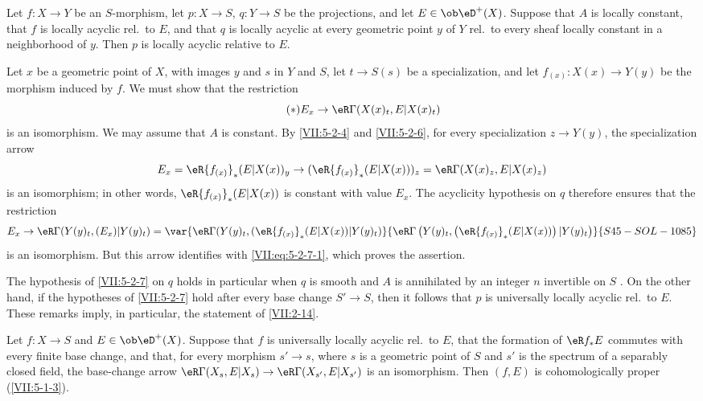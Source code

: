 \begin{corollary}\label{VII:5-2-7}
Let $f:X\to Y$ be an $S$-morphism, let $p:X\to S$, $q:Y\to S$ be the
projections, and let $E\in\ob\eD^+(X)$. Suppose that $A$ is locally constant,
that $f$ is locally acyclic rel.\ to $E$, and that $q$ is locally acyclic at
every geometric point $y$ of $Y$ rel.\ to every sheaf locally constant
in a neighborhood of $y$. Then $p$ is locally acyclic relative to $E$.
\end{corollary}

Let $x$ be a geometric point of $X$, with images $y$ and $s$ in $Y$ and $S$,
let $t\to S(s)$ be a specialization, and let
$f_{(x)}:X(x)\to Y(y)$ be the morphism induced by $f$. We must show that the
restriction
\begin{equation*}\tag{$*$}\label{VII:eq:5-2-7-1}
  E_x \to \eR\Gamma(X(x)_t,E|X(x)_t) 
\end{equation*}
is an isomorphism. We may assume that $A$ is constant. By \ref{VII:5-2-4} and
\ref{VII:5-2-6}, for every specialization $z\to Y(y)$, the specialization
arrow
\[
  E_x = \eR {f_{(x)}}_\ast (E|X(x))_y \to (\eR {f_{(x)}}_\ast (E|X(x)))_z = \eR\Gamma(X(x)_z,E|X(x)_z) 
\]
is an isomorphism; in other words, $\eR{f_{(x)}}_\ast(E|X(x))$ is constant
with value $E_x$. The acyclicity hypothesis on $q$ therefore ensures that the restriction
\[
  E_x \to \eR\Gamma(Y(y)_t,(E_x)|Y(y)_t) = \var{\eR\Gamma(Y(y)_t,(\eR {f_{(x)}}_\ast (E|X(x))|Y(y)_t)}{\eR\Gamma\left(Y(y)_t,\left(\eR {f_{(x)}}_\ast (E|X(x))\right)|Y(y)_t\right)}{S45-SOL-1085}
\]
is an isomorphism. But this arrow identifies with
\eqref{VII:eq:5-2-7-1}, which proves the assertion.

The hypothesis of \ref{VII:5-2-7} on $q$ holds in particular when $q$ is
smooth and $A$ is annihilated by an integer $n$ invertible on $S$
\cite[XV]{sga4}. On the other hand, if the hypotheses of \ref{VII:5-2-7} hold
after every base change $S'\to S$, then it follows that $p$ is universally
locally acyclic rel.\ to $E$. These remarks imply, in particular, the
statement of \ref{VII:2-14}.






\begin{corollary}\label{VII:5-2-8}
Let $f:X\to S$ and $E\in \ob\eD^+(X)$. Suppose that $f$ is universally locally
acyclic rel.\ to $E$, that the formation of $\eR f_\ast E$ commutes with
every finite base change, and that, for every morphism $s'\to s$, where $s$ is
a geometric point of $S$ and $s'$ is the spectrum of a separably closed
field, the base-change arrow
$\eR\Gamma(X_s,E|X_s)\to \eR\Gamma(X_{s'},E|X_{s'})$ is an isomorphism. Then
$(f,E)$ is cohomologically proper (\ref{VII:5-1-3}).
\end{corollary}

